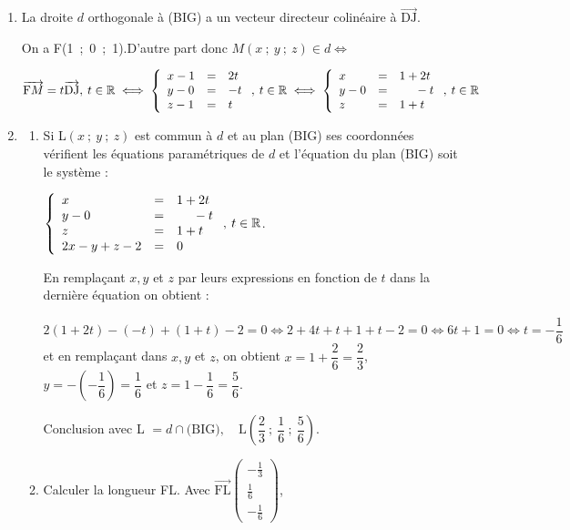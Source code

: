 \documentclass[10pt]{article}
\providecommand{\R}{\mathbb{R}}
\providecommand{\vect}[1]{\overrightarrow{#1}}
\begin{document}
\begin{enumerate}
Or B(1~;~0~;~0)$ \in  (\text{BIG}) \iff 2\times 1 - 1 \times 0 + 1 \times 0 + d = 0 \iff 2 + d = 0 \iff d = - 2$.

On a donc $M(x~;~y~;~z) \in (\text{BIG}) \iff 2x - 1y + 1z - 2 = 0$
\item 
La droite $d$ orthogonale à (BIG) a un vecteur directeur colinéaire à $\vect{\text{DJ}}$.

On a F(1~;~0~;~1).D'autre part donc $M(x~;~y~;~z) \in d \iff$

$ \vect{\text{F}M}  = t \vect{\text{DJ}}, \: t \in \R \iff \left\{\begin{array}{l c l}
x - 1&=&2t\\
y - 0&=&- t\\
z- 1&=&t
\end{array}\right., \:t \in \R \iff \left\{\begin{array}{l c l}
x &=&1 + 2t\\
y - 0&=&\phantom{1 + }- t\\
z&=&1 + t
\end{array}\right., \:t \in \R$

\item
	\begin{enumerate}
		\item 
Si L$(x~;~y~;~z)$ est commun à $d$ et au plan (BIG) ses coordonnées vérifient les équations paramétriques de $d$ et l'équation du plan (BIG) soit le système :
		
$\left\{\begin{array}{l c l}
x &=&1 + 2t\\
y - 0&=&\phantom{1 + }- t\\
z&=&1 + t\\
2x - y + z - 2&=&0
\end{array}\right., \:t \in \R$.

En remplaçant $x, y$ et $z$ par leurs expressions en fonction de $t$ dans la dernière équation on obtient :

$2(1 + 2t) - (- t) + (1 + t) - 2 = 0 \iff 2 + 4t + t + 1 + t - 2 = 0\iff 6t + 1 = 0\iff t = - \dfrac16$ et en remplaçant dans $x, y$ et $z$, on obtient $x = 1 + \dfrac26 = \dfrac23$,\:$y = -\left(- \dfrac16 \right) = \dfrac16$ et $z = 1 - \dfrac16  = \dfrac56$.

Conclusion avec L $ = d \cap \text{(BIG)},\quad  \text{L}\left(\dfrac23~;~\dfrac16~;~\dfrac56\right)$.
		

		\item Calculer la longueur FL.
Avec $\vect{\text{FL}}\begin{pmatrix} -\frac13\\\frac16\\- \frac16 \end{pmatrix}$, 


\end{enumerate}
\end{enumerate}
\end{document}
